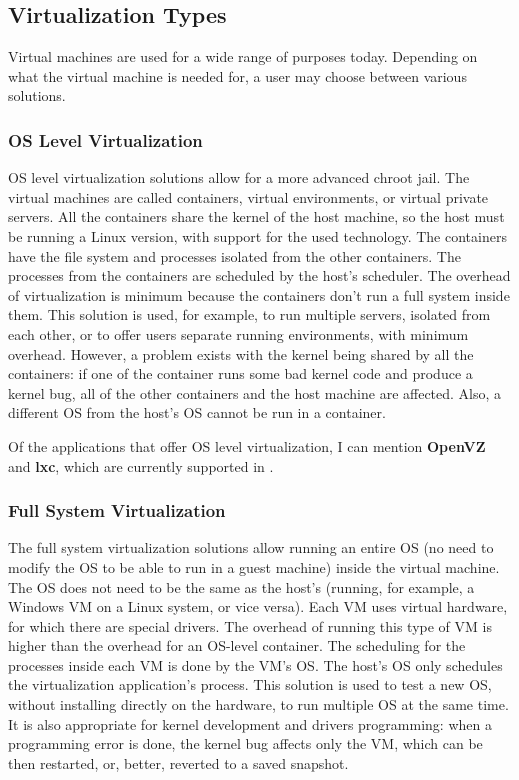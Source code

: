 \subsection{Virtualization Types}
\label{sub-sec:virt-types}
Virtual machines are used for a wide range of purposes today. Depending on what
the virtual machine is needed for, a user may choose between various solutions.

\subsubsection{OS Level Virtualization}
\label{sub-sub-sec:virt-os-level}
OS level virtualization solutions allow for a more advanced chroot jail. The
virtual machines are called containers, virtual environments, or virtual
private servers. All the containers share the kernel of the host machine, so
the host must be running a Linux version, with support for the used technology.
The containers have the file system and processes isolated from the other
containers. The processes from the containers are scheduled by the host's
scheduler. The overhead of virtualization is minimum because the containers
don't run a full system inside them. This solution is used, for example, to run
multiple servers, isolated from each other, or to offer users separate running
environments, with minimum overhead. However, a problem exists with the kernel
being shared by all the containers: if one of the container runs some bad
kernel code and produce a kernel bug, all of the other containers and the host
machine are affected. Also, a different OS from the host's OS cannot be run in
a container.

Of the applications that offer OS level virtualization, I can mention
\textbf{OpenVZ} and \textbf{lxc}, which are currently supported in \project.

\subsubsection{Full System Virtualization}
\label{sub-sub-sec:virt-full}
The full system virtualization solutions allow running an entire OS (no need to
modify the OS to be able to run in a guest machine) inside the virtual machine.
The OS does not need to be the same as the host's (running, for example, a
Windows VM on a Linux system, or vice versa). Each VM uses virtual hardware,
for which there are special drivers. The overhead of running this type of VM is
higher than the overhead for an OS-level container. The scheduling for the
processes inside each VM is done by the VM's OS. The host's OS only schedules
the virtualization application's process. This solution is used to test a new
OS, without installing directly on the hardware, to run multiple OS at the same
time. It is also appropriate for kernel development and drivers programming:
when a programming error is done, the kernel bug affects only the VM, which can
be then restarted, or, better, reverted to a saved snapshot.

